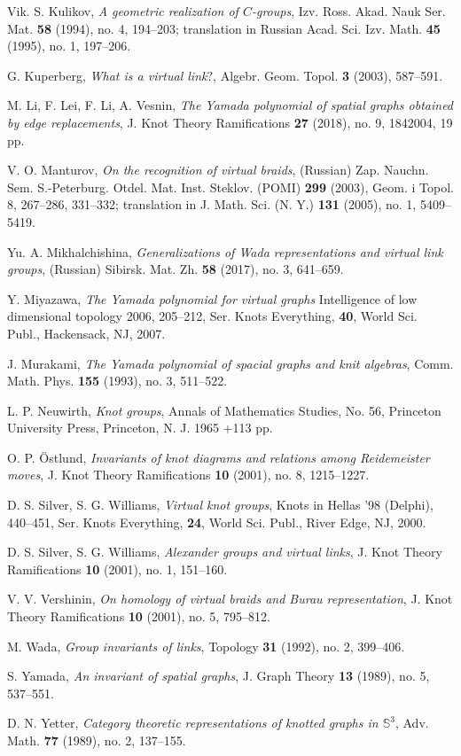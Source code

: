 \documentclass[11 pt, reqno]{amsart}
\theoremstyle{definition}
\numberwithin{equation}{subsection}
\begin{document}
\begin{thebibliography}{HD}
Vik. S. Kulikov, \textit{A geometric realization of $C$-groups}, Izv. Ross. Akad. Nauk Ser. Mat. \textbf{58} (1994), no. 4, 194--203; translation in Russian Acad. Sci. Izv. Math. \textbf{45} (1995), no. 1, 197--206.

G. Kuperberg, \textit{What is a virtual link$?$}, Algebr. Geom. Topol. \textbf{3} (2003), 587--591.

M. Li, F. Lei, F. Li, A. Vesnin, \textit{The Yamada polynomial of spatial graphs obtained by edge replacements}, J. Knot Theory Ramifications \textbf{27} (2018), no. 9, 1842004, 19 pp.

V. O. Manturov, \textit{On the recognition of virtual braids}, (Russian) Zap. Nauchn. Sem. S.-Peterburg. Otdel. Mat. Inst. Steklov. (POMI)
\textbf{299} (2003), Geom. i Topol. 8, 267--286, 331--332; translation in J. Math. Sci. (N. Y.) \textbf{131} (2005), no. 1, 5409--5419.

Yu. A. Mikhalchishina,  \textit{Generalizations of Wada representations and virtual link groups}, (Russian) Sibirsk. Mat. Zh. \textbf{58} (2017), no. 3, 641--659.

Y. Miyazawa, \textit{The Yamada polynomial for virtual graphs} Intelligence of low dimensional topology 2006, 205--212, Ser. Knots Everything, \textbf{40}, World Sci. Publ., Hackensack, NJ, 2007.

J. Murakami, \textit{The Yamada polynomial of spacial graphs and knit algebras}, Comm. Math. Phys. \textbf{155} (1993), no. 3, 511--522.

L. P. Neuwirth, \textit{Knot groups}, Annals of Mathematics Studies, No. 56, Princeton University Press, Princeton, N. J. 1965  +113 pp.

O. P. \"Ostlund,  \textit{Invariants of knot diagrams and relations among Reidemeister moves}, J. Knot Theory Ramifications \textbf{10} (2001), no. 8, 1215--1227.

D. S. Silver, S. G. Williams, \textit{Virtual knot groups}, Knots in Hellas '98 (Delphi), 440--451, Ser. Knots Everything, \textbf{24}, World Sci. Publ., River Edge, NJ, 2000.

D. S. Silver, S. G. Williams, \textit{Alexander groups and virtual links}, J. Knot Theory Ramifications \textbf{10} (2001), no. 1, 151--160.

V. V. Vershinin, \textit{On homology of virtual braids and Burau representation},  J. Knot Theory Ramifications \textbf{10} (2001), no. 5,  795--812.

M. Wada, \textit{Group invariants of links}, Topology \textbf{31} (1992), no. 2, 399--406.

S. Yamada, \textit{An invariant of spatial graphs}, J. Graph Theory \textbf{13} (1989), no. 5, 537--551.

D. N. Yetter, \textit{Category theoretic representations of knotted graphs in $\mathbb{S}^3$}, Adv. Math. \textbf{77} (1989), no. 2, 137--155.
\end{thebibliography}
\end{document}
